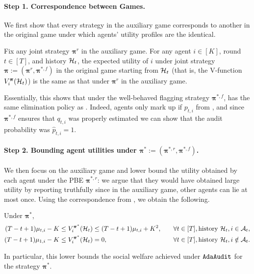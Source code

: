 \paragraph{Step 1. Correspondence between Games.} We first show that every strategy in the auxiliary game corresponds to another in the original game under which agents' utility profiles are the identical.
\begin{lemma}\label{lem:equiv between actual and no-flagging}
Fix any joint strategy $\bm \pi^r$ in the auxiliary game. For any agent $i\in [K]$, round $t\in[T]$, and history $\mathcal{H}_t$, the expected utility of $i$ under joint strategy $\bm \pi:=(\bm\pi^r,\bm\pi^{\ast,f})$ in the original game starting from $\mathcal{H}_t$ (that is, the V-function $V_i^{\bm \pi}(\mathcal{H}_t)$) is the same as that under $\bm \pi^r$ in the auxiliary game.
\end{lemma}
Essentially, this shows that under the well-behaved flagging strategy $\bm\pi^{\ast,f}$, \mechname has the same elimination policy as . Indeed, agents only mark up if $p_{t,i}$ from , and since $\bm\pi^{\ast,f}$ ensures that $q_{t,i}$ was properly estimated we can show that the audit probability was $\hat p_{t,i}=1$.

\paragraph{Step 2. Bounding agent utilities under $\bm\pi^\ast:=(\bm\pi^{\ast,r},\bm\pi^{\ast,f})$.}
We then focus on the auxiliary game and lower bound the utility obtained by each agent under the PBE $\bm\pi^{\ast,r}$: we argue that they would have obtained large utility by reporting truthfully since in the auxiliary game, other agents can lie at most once. Using the correspondence from , we obtain the following.
\begin{lemma}\label{lem:u lower and upper bound}
Under $\bm \pi^\ast$,
\begin{align}
(T-t+1) \mu_{t,i}-K &\leq V_i^{{\bm \pi}^\ast}(\mathcal{H}_t)\leq (T-t+1) \mu_{t,i}+K^2,&&\quad \forall t\in [T],\text{history }\mathcal{H}_t, i\in \mathcal{A}_t,\label{eq:for alive}\\
(T-t+1) \mu_{1,i}-K &\leq V_i^{{\bm \pi}^\ast}(\mathcal{H}_t)=0,&&\quad \forall t\in [T],\text{history }\mathcal{H}_t,i\notin \mathcal{A}_t. \label{eq:for dead}
\end{align}
\end{lemma}
In particular, this lower bounds the social welfare achieved under $\texttt{AdaAudit}$ for the strategy $\bm\pi^\ast$.

